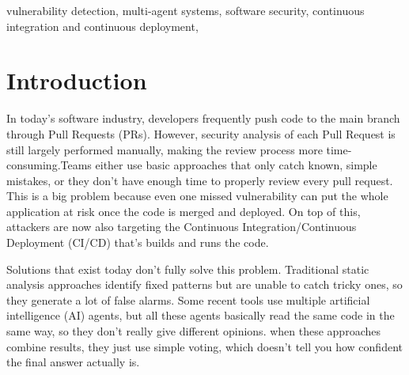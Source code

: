 \documentclass[conference]{IEEEtran}
\begin{document}
\begin{abstract}
Modern software development increasingly relies
on Continuous Integration/Continuous Deployment (CI/CD) pipelines to deliver software rapidly, but automated
security review at the pull request stage remains limited. Existing
security tools rely on rigid static analysis or homogeneous multi-
agent approaches, which may generate false positives or overlook
complex vulnerabilities. This project will present CodeSheriff, an
agentic security auditor that will analyze GitHub pull requests
using structural, semantic, contextual, and SFI-based confidential
execution analysis. A Bayesian inference engine will fuse evidence
from multiple agents to generate confidence-aware vulnerability
assessments, while an automated patch generation and verifica-
tion module will recommend and validate fixes through GitHub
and a web dashboard. The system will enhance CI/CD security
by delivering reliable, explainable, and statistically grounded
vulnerability detection while reducing manual review effort.
\end{abstract}
\vspace{6pt}
\begin{IEEEkeywords}
vulnerability detection, multi-agent systems, software security,
continuous integration and continuous deployment, 

\end{IEEEkeywords}


\section{Introduction}
In today’s software industry, developers frequently push code to the main branch through Pull Requests (PRs). However, security analysis of each Pull Request is still largely performed manually, making the review process more time-consuming.Teams either use basic approaches that only catch known, simple mistakes, or they don't have enough time to properly review every pull request. This is a big problem because even one missed vulnerability can put the whole application at risk once the code is merged and deployed. On top of this, attackers are now also targeting the Continuous Integration/Continuous Deployment (CI/CD) that's builds and runs the code.

Solutions that exist today don’t fully solve this problem. Traditional static analysis approaches identify fixed patterns but are unable to catch tricky ones, so they generate a lot of false alarms. Some recent tools use multiple artificial intelligence (AI) agents, but all these agents basically read the same code in the same way, so they don't really give different opinions. when these approaches combine results, they just use simple voting, which doesn't tell you how confident the final answer actually is.
\end{document}
